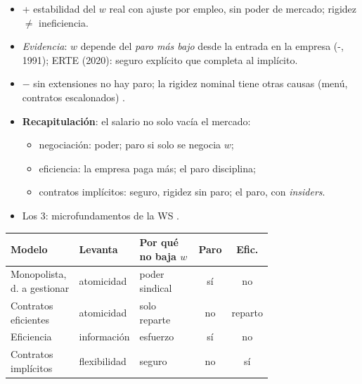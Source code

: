 \documentclass{article}
\begin{document}
\begin{columnas}
\begin{itemize}
\item + estabilidad del $w$ real con ajuste por empleo, sin poder de mercado; rigidez $\neq$ ineficiencia.
\item \emph{Evidencia}: $w$ depende del \emph{paro más bajo} desde la entrada en la empresa (-, 1991); ERTE (2020): seguro explícito que completa al implícito.
\item $-$ sin extensiones no hay paro; la rigidez nominal tiene otras causas (menú, contratos escalonados) .
\end{itemize}

\begin{itemize}
\item \textbf{Recapitulación}: el salario no solo vacía el mercado:
  \begin{itemize}
  \item negociación: poder; paro si solo se negocia $w$;
  \item eficiencia: la empresa paga más; el paro disciplina;
  \item contratos implícitos: seguro, rigidez sin paro; el paro, con \emph{insiders}.
  \end{itemize}
\item Los 3: microfundamentos de la WS .
\end{itemize}
{\centering\scriptsize\renewcommand{\arraystretch}{1.05}\setlength{\tabcolsep}{2pt}%
\begin{tabular}{@{}>{\raggedright\arraybackslash}p{0.27\linewidth}>{\raggedright\arraybackslash}p{0.2\linewidth}>{\raggedright\arraybackslash}p{0.27\linewidth}cc@{}}
\toprule
\rowcolor{tceeazulpalido}\textbf{Modelo} & \textbf{Levanta} & \textbf{Por qué no baja $w$} & \textbf{Paro} & \textbf{Efic.}\\
\midrule
Monopolista, d. a gestionar & atomicidad & poder sindical & \textcolor{tceerojo}{sí} & \textcolor{tceerojo}{no}\\
Contratos eficientes & atomicidad & solo reparte & \textcolor{tceeverde}{no} & \textcolor{tceeverde}{reparto}\\
Eficiencia & información & esfuerzo & \textcolor{tceerojo}{sí} & \textcolor{tceerojo}{no}\\
Contratos implícitos & flexibilidad & seguro & \textcolor{tceeverde}{no} & \textcolor{tceeverde}{sí}\\

\end{tabular}}
\end{columnas}
\end{document}
